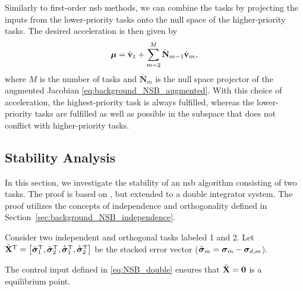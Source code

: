 Similarly to first-order \gls{nsb} methods, we can combine the tasks by projecting the inputs from the lower-priority tasks onto the null space of the higher-priority tasks.
The desired acceleration is then given by
\begin{equation}
    \bm{\mu} = \dot{\mathbf{v}}_1 + \sum_{m=2}^M \bar{\mathbf{N}}_{m-1}\dot{\mathbf{v}}_m,
    \label{eq:NSB_double}
\end{equation}
where $M$ is the number of tasks and $\bar{\mathbf{N}}_m$ is the null space projector of the augmented Jacobian \eqref{eq:background_NSB_augmented}.
With this choice of acceleration, the highest-priority task is always fulfilled, whereas the lower-priority tasks are fulfilled as well as possible in the subspace that does not conflict with higher-priority tasks.

\subsection{Stability Analysis}
In this section, we investigate the stability of an \gls{nsb} algorithm consisting of two tasks.
The proof is based on \cite{antonelli_stability_2008}, but extended to a double integrator system.
The proof utilizes the concepts of independence and orthogonality defined in Section~\ref{sec:background_NSB_independence}.

\begin{lemma}\label{theorem:one}
    Consider two independent and orthogonal tasks labeled 1 and 2.
    Let
    $
        \Tilde{\mathbf{X}}^{\mathrm{T}} = \left[\Tilde{\bm{\sigma}}_1^{\mathrm{T}}, \Tilde{\bm{\sigma}}_2^{\mathrm{T}}, \dot{\Tilde{\bm{\sigma}}}_1^{\mathrm{T}}, \dot{\Tilde{\bm{\sigma}}}_2^{\mathrm{T}} \right]
    $
    be the stacked error vector ($\Tilde{\bm{\sigma}}_m = \bm{\sigma}_m - \bm{\sigma}_{d,m}$).

    The control input defined in \eqref{eq:NSB_double} ensures that $\Tilde{\mathbf{X}} = \mathbf{0}$ is a  equilibrium point.
\end{lemma}

